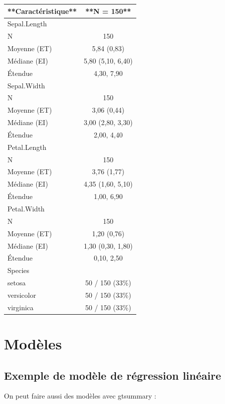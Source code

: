 \documentclass[
]{book}
\begin{document}
\begin{tabular}{l|c}
\hline
**Caractéristique** & **N = 150**\\
\hline
Sepal.Length & \\
\hline
N & 150\\
\hline
Moyenne (ET) & 5,84 (0,83)\\
\hline
Médiane (EI) & 5,80 (5,10, 6,40)\\
\hline
Étendue & 4,30, 7,90\\
\hline
Sepal.Width & \\
\hline
N & 150\\
\hline
Moyenne (ET) & 3,06 (0,44)\\
\hline
Médiane (EI) & 3,00 (2,80, 3,30)\\
\hline
Étendue & 2,00, 4,40\\
\hline
Petal.Length & \\
\hline
N & 150\\
\hline
Moyenne (ET) & 3,76 (1,77)\\
\hline
Médiane (EI) & 4,35 (1,60, 5,10)\\
\hline
Étendue & 1,00, 6,90\\
\hline
Petal.Width & \\
\hline
N & 150\\
\hline
Moyenne (ET) & 1,20 (0,76)\\
\hline
Médiane (EI) & 1,30 (0,30, 1,80)\\
\hline
Étendue & 0,10, 2,50\\
\hline
Species & \\
\hline
setosa & 50 / 150 (33\%)\\
\hline
versicolor & 50 / 150 (33\%)\\
\hline
virginica & 50 / 150 (33\%)\\
\hline
\end{tabular}

\section{Modèles}\label{moduxe8les}

\subsection{Exemple de modèle de régression linéaire}\label{exemple-de-moduxe8le-de-ruxe9gression-linuxe9aire}

On peut faire aussi des modèles avec gtsummary :
\end{document}
